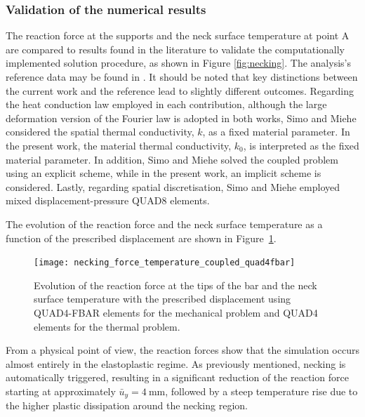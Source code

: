      \subsubsection{Validation of the numerical results}

     The reaction force at the supports and the neck surface temperature at point A are compared to results found in the literature to validate the computationally implemented solution procedure, as shown in Figure \ref{fig:necking}.
     The analysis's reference data may be found in \cite{simo_associative_1992}.
     It should be noted that key distinctions between the current work and the reference lead to slightly different outcomes.
     Regarding the heat conduction law employed in each contribution, although the large deformation version of the Fourier law is adopted in both works, Simo and Miehe \citep{simo_associative_1992} considered the spatial thermal conductivity, $k$, as a fixed material parameter.
     In the present work, the material thermal conductivity, $k_{0}$, is interpreted as the fixed material parameter.
     In addition, Simo and Miehe \citep{simo_associative_1992} solved the coupled problem using an explicit scheme, while in the present work, an implicit scheme is considered.
     Lastly, regarding  spatial discretisation, Simo and Miehe \citep{simo_associative_1992} employed mixed displacement-pressure QUAD8 elements.

     The evolution of the reaction force and the neck surface temperature as a function of the prescribed displacement are shown in Figure~\ref{fig:necking_force_temperature_coupled_quad4fbar}.
     \begin{figure}[!hbtp]
       \centering
       \texttt{[image: necking\_force\_temperature\_coupled\_quad4fbar]}
       \caption{Evolution of the reaction force at the tips of the bar and the neck surface temperature with the prescribed displacement using QUAD4-FBAR elements for the mechanical problem and QUAD4 elements for the thermal problem.}
       \label{fig:necking_force_temperature_coupled_quad4fbar}
     \end{figure}
     From a physical point of view, the reaction forces show that the simulation occurs almost entirely in the elastoplastic regime.
     As previously mentioned, necking is automatically triggered, resulting in a significant reduction of the reaction force starting at approximately $\bar{u}_{y}=\SI{4}{\milli\meter}$, followed by a steep temperature rise due to the higher plastic dissipation around the necking region.

